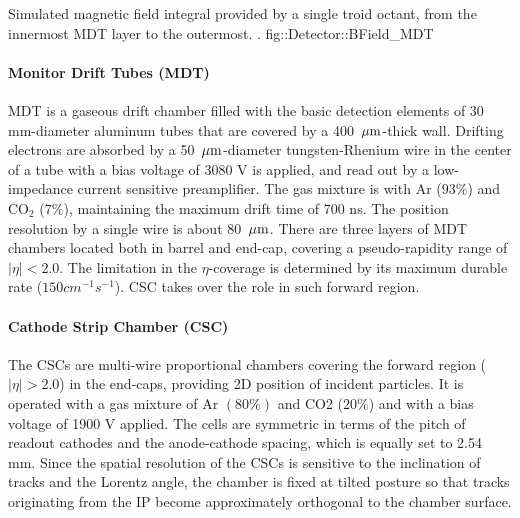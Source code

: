 
{ Simulated magnetic field integral provided by a single troid octant, from the innermost MDT layer to the outermost. \cite{ATLAS_exp}.}
{fig::Detector::BField_MDT}
\clearpage




\paragraph{Monitor Drift Tubes (MDT)}
MDT is a gaseous drift chamber filled with the basic detection elements of 30 mm-diameter aluminum tubes that are covered by a 400 $\, \mathrm{\mu m}$-thick wall. 
Drifting electrons are absorbed by a 50 $\, \mathrm{\mu m}$-diameter tungsten-Rhenium wire in the center of a tube with a bias voltage of 3080 V is applied, and read out by a low-impedance current sensitive preamplifier.
The gas mixture is with Ar ($93\%$) and $\mathrm{CO_2}$ ($7\%$), maintaining the maximum drift time of 700 ns. The position resolution by a single wire is about 80 $\, \mathrm{\mu m}$.
There are three layers of MDT chambers located both in barrel and end-cap, covering a pseudo-rapidity range of $|\eta|<2.0$.
The limitation in the $\eta$-coverage is determined by its maximum durable rate ($150 cm^{-1}s^{-1}$). CSC takes over the role in such forward region.


\paragraph{Cathode Strip Chamber (CSC)}
The CSCs are multi-wire proportional chambers covering the forward region ($|\eta|>2.0$) in the end-caps, providing 2D position of incident particles.
It is operated with a gas mixture of Ar $(80\%)$ and CO2 ($20\%$) and with a bias voltage of 1900 V applied.
The cells are symmetric in terms of the pitch of readout cathodes and the anode-cathode spacing, which is equally set to 2.54 mm.
Since the spatial resolution of the CSCs is sensitive to the inclination of tracks and the Lorentz angle, the chamber is fixed at tilted posture so that tracks originating from the IP become approximately orthogonal to the chamber surface.


